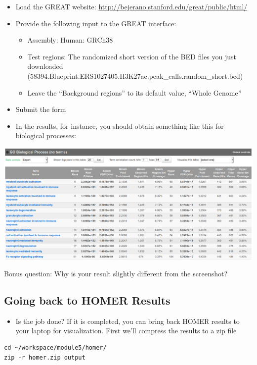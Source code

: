 \documentclass[
]{book}
\providecommand{\tightlist}{%
  \setlength{\itemsep}{0pt}\setlength{\parskip}{0pt}}
\begin{document}
\begin{itemize}
\item
  Load the GREAT website: \url{http://bejerano.stanford.edu/great/public/html/}
\item
  Provide the following input to the GREAT interface:

  \begin{itemize}
  \tightlist
  \item
    Assembly: Human: GRCh38
  \item
    Test regions: The randomized short version of the BED files you just downloaded (58394.Blueprint.ERS1027405.H3K27ac.peak\_calls.random\_short.bed)
  \item
    Leave the ``Background regions'' to its default value, ``Whole Genome''
  \end{itemize}
\item
  Submit the form
\item
  In the results, for instance, you should obtain something like this for biological processes:
\end{itemize}

\includegraphics{./img/GREAT_go_biological_process.png}

Bonus question: Why is your result slightly different from the screenshot?

\subsection{Going back to HOMER Results}\label{going-back-to-homer-results}

\begin{itemize}
\tightlist
\item
  Is the job done? If it is completed, you can bring back HOMER results to your laptop for visualization. First we'll compress the results to a zip file
\end{itemize}

\begin{verbatim}
cd ~/workspace/module5/homer/
zip -r homer.zip output
\end{verbatim}
\end{document}
